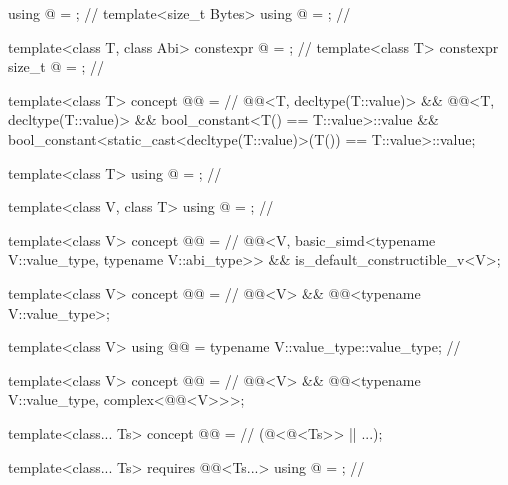 \begin{codeblock}
using @ = \seebelownc@;                                    // \expos
template<size_t Bytes> using @ = \seebelownc@;               // \expos

template<class T, class Abi>
  constexpr @  = \seebelownc@;                  // \expos
template<class T> constexpr size_t @ = \seebelownc@;    // \expos

template<class T>
  concept @@ =                                   // \expos
    @@<T, decltype(T::value)> &&
    @@<T, decltype(T::value)> &&
    bool_constant<T() == T::value>::value &&
    bool_constant<static_cast<decltype(T::value)>(T()) == T::value>::value;

template<class T> using @ = \seebelownc@;                  // \expos

template<class V, class T> using @ = \seebelownc@; // \expos

template<class V>
  concept @@ =                                                // \expos
    @@<V, basic_simd<typename V::value_type, typename V::abi_type>> &&
    is_default_constructible_v<V>;

template<class V>
  concept @@ =                                      // \expos
    @@<V> && @@<typename V::value_type>;

template<class V>
  using @@ = typename V::value_type::value_type; // \expos

template<class V>
  concept @@ =                                             // \expos
    @@<V> && @@<typename V::value_type, complex<@@<V>>>;

template<class... Ts>
  concept @@ =                                      // \expos
    (@<@<Ts>> || ...);

template<class... Ts>
  requires @@<Ts...>
    using @ = \seebelownc@;                            // \expos


\end{codeblock}
